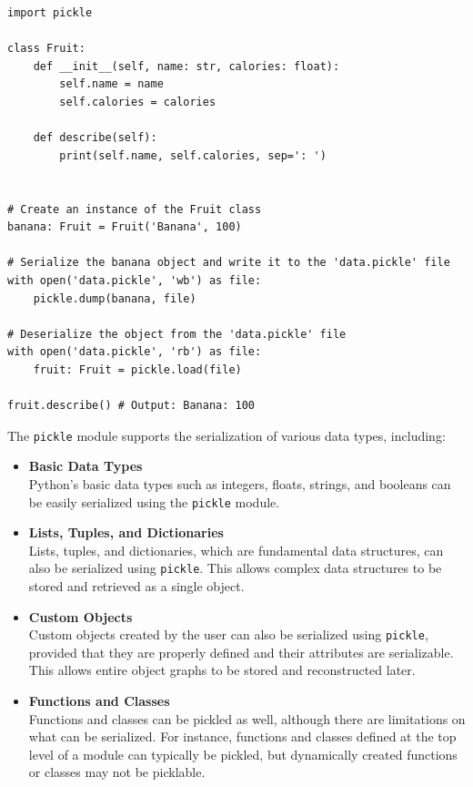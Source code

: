 \begin{codebox}
\begin{verbatim}
import pickle

class Fruit:
    def __init__(self, name: str, calories: float):
        self.name = name
        self.calories = calories
    
    def describe(self):
        print(self.name, self.calories, sep=': ')


# Create an instance of the Fruit class
banana: Fruit = Fruit('Banana', 100)

# Serialize the banana object and write it to the 'data.pickle' file
with open('data.pickle', 'wb') as file:
    pickle.dump(banana, file)
    
# Deserialize the object from the 'data.pickle' file
with open('data.pickle', 'rb') as file:
    fruit: Fruit = pickle.load(file)

fruit.describe() # Output: Banana: 100
\end{verbatim}
\end{codebox}


\newpage
The \texttt{pickle} module supports the serialization of various data types, including:

\begin{itemize}
    \item \textbf{Basic Data Types}\\
    Python's basic data types such as integers, floats, strings, and booleans can be easily serialized using the \texttt{pickle} module.
    
    \item \textbf{Lists, Tuples, and Dictionaries}\\
    Lists, tuples, and dictionaries, which are fundamental data structures, can also be serialized using \texttt{pickle}. This allows complex data structures to be stored and retrieved as a single object.
    
    \item \textbf{Custom Objects}\\
    Custom objects created by the user can also be serialized using \texttt{pickle}, provided that they are properly defined and their attributes are serializable. This allows entire object graphs to be stored and reconstructed later.
    
    \item \textbf{Functions and Classes}\\
    Functions and classes can be pickled as well, although there are limitations on what can be serialized. For instance, functions and classes defined at the top level of a module can typically be pickled, but dynamically created functions or classes may not be picklable.
\end{itemize}

